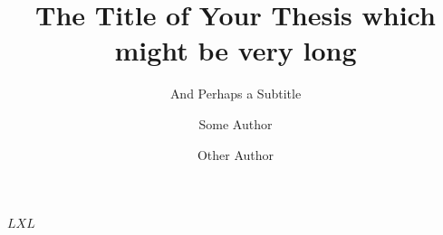 \documentclass[masters,a4paper]{chalmers-thesis}
\title{The Title of Your Thesis which might be very long}
\subtitle{And Perhaps a Subtitle}
\author{Some Author\and Other Author}
\begin{document}
\maketitle


$LXL$
%

%

\nocite{*} %
\printbibliography
\end{document}
